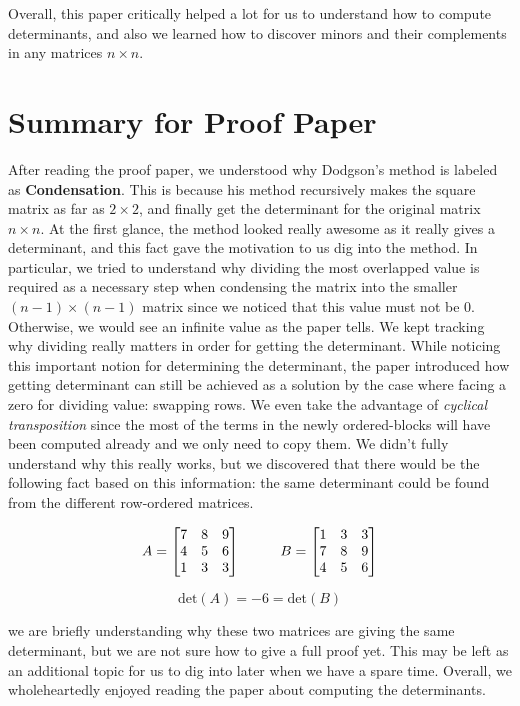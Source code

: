 \documentclass[12pt]{article}
\newcommand{\matxxx}[3] {
\begin{bmatrix}
  #1 \\
  #2 \\
  #3 \\
\end{bmatrix}
}
\begin{document}
\noindent Overall, this paper critically helped a lot for us to understand how to compute determinants, and
also we learned how to discover minors and their complements in any matrices \(n \times n\).

\pagebreak

\section{Summary for Proof Paper}

After reading the proof paper, we understood why Dodgson's method is labeled as \textbf{Condensation}.
This is because his method recursively makes the square matrix as far as \(2 \times 2\), and finally get
the determinant for the original matrix \(n \times n\). At the first glance, the method looked really awesome as it really gives a
determinant, and this fact gave the motivation to us dig into the method. In particular, we tried to understand why dividing the most overlapped value is required as a necessary step when
condensing the matrix into the smaller \((n-1) \times (n-1)\) matrix since we noticed that this value must not be \(0\). Otherwise,
we would see an infinite value as the paper tells. We kept tracking why dividing really matters in order for getting the determinant.
While noticing this important notion for determining the determinant, the paper introduced how getting determinant can still be achieved as a solution by the case where facing a zero for dividing value: swapping rows.
We even take the advantage of \textit{cyclical transposition} since the most of the terms in the newly ordered-blocks will have been computed already and we only need to copy them.
We didn't fully understand why this really works, but we discovered that there would be the following fact based on this information:
the same determinant could be found from the different row-ordered matrices.

\[
  \begin{split}
    A & = \matxxx{7 & 8 & 9}{4 & 5 & 6}{1 & 3 & 3} \hspace{1.0cm} B = \matxxx{1 & 3 & 3}{7 & 8 & 9}{4 & 5 & 6} \\
  \end{split}
\]

\[
  \mbox{det}(A) = -6 = \mbox{det}(B)
\]

we are briefly understanding why these two matrices are giving the same determinant, but we are not sure how to give a full proof yet.
This may be left as an additional topic for us to dig into later when we have a spare time. Overall, we wholeheartedly enjoyed reading the paper
about computing the determinants.
\end{document}
